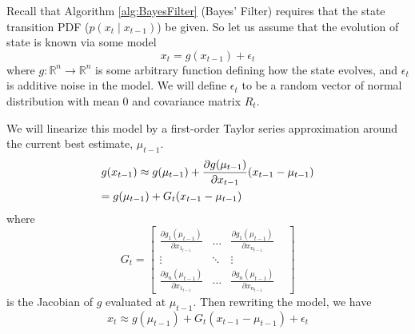 Recall that Algorithm \ref{alg:BayesFilter} (Bayes' Filter) requires that the state transition PDF (\(p(x_t \mathbin{\vert} x_{t-1})\)) be given. So let us assume that the evolution of state is known via some model \[x_t =  g(x_{t-1}) + \epsilon_t\] where \(g: \mathbb{R}^n \to \mathbb{R}^n\) is some arbitrary function defining how the state evolves, and \(\epsilon_t\) is additive noise in the model. We will define \(\epsilon_t\) to be a random vector of normal distribution with mean 0 and covariance matrix \(R_t\).

We will linearize this model by a first-order Taylor series approximation around the current best estimate, \(\mu_{t-1}\).
\begin{multline*}
g(x_{t-1}) \approx g(\mu_{t-1}) + \frac{\partial g(\mu_{t-1})}{\partial x_{t-1}} (x_{t-1} - \mu_{t-1}) \\
= g(\mu_{t-1}) + G_t (x_{t-1} - \mu_{t-1}) \hfill
\end{multline*}
where \[
G_t = \begin{bmatrix} 
\frac{\partial g_1(\mu_{t-1})}{\partial x_{1_{t-1}}} & \dots & \frac{\partial g_1(\mu_{t-1})}{\partial x_{n_{t-1}}}\\
\vdots & \ddots & \vdots & \\
\frac{\partial g_n(\mu_{t-1})}{\partial x_{1_{t-1}}} & \dots & \frac{\partial g_n(\mu_{t-1})}{\partial x_{n_{t-1}}} 
\end{bmatrix} \] is the Jacobian of \(g\) evaluated at \(\mu_{t-1}\). Then rewriting the model, we have
\begin{equation*}
x_t \approx g(\mu_{t-1}) + G_t (x_{t-1} - \mu_{t-1}) + \epsilon_t
\end{equation*}

